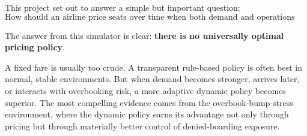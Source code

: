 \documentclass[11pt,a4paper]{article}
\begin{document}
This project set out to answer a simple but important question:
\[
\text{How should an airline price seats over time when both demand and operations are uncertain?}
\]

The answer from this simulator is clear: \textbf{there is no universally optimal pricing policy}.

A fixed fare is usually too crude. A transparent rule-based policy is often best in normal, stable environments. But when demand becomes stronger, arrives later, or interacts with overbooking risk, a more adaptive dynamic policy becomes superior. The most compelling evidence comes from the overbook-bump-stress environment, where the dynamic policy earns its advantage not only through pricing but through materially better control of denied-boarding exposure.
\end{document}
